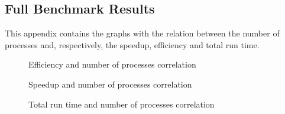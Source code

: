\subsection{Full Benchmark Results}

This appendix contains the graphs with the relation between the number of processes and, respectively, the speedup, efficiency and total run time.

\begin{figure}[!ht]
    \centering
    
    
    
    
    \caption{Efficiency and number of processes correlation}
\end{figure}

\begin{figure}[!ht]
    \centering
    
    
    
    
    \caption{Speedup and number of processes correlation}
    \label{fig:speedup}
\end{figure}

\begin{figure}[!ht]
    \centering
    
    
    
    
    \caption{Total run time and number of processes correlation}
\end{figure}

